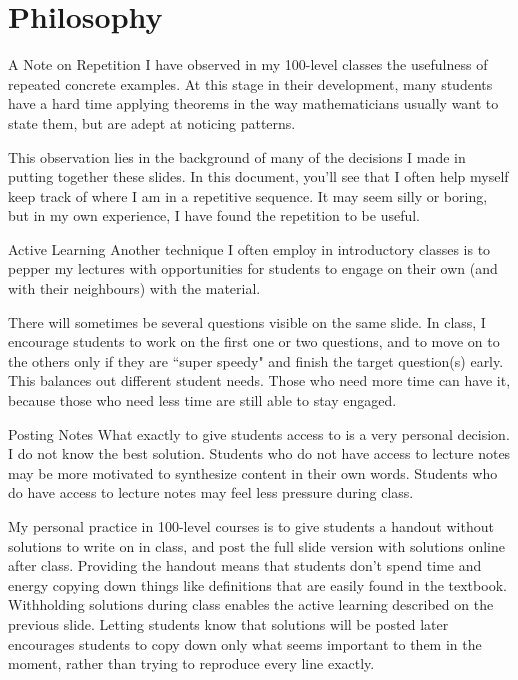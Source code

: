 \documentclass[10pt]{beamer}
\begin{document}
\section{Philosophy}
\frame{\tableofcontents[currentsection]}
\begin{frame}{A Note on Repetition}
I have observed in my 100-level classes the usefulness of repeated concrete examples. At this stage in their development, many students have a hard time applying theorems in the way mathematicians usually want to state them, but are adept at noticing patterns.\vfill

This observation lies in the background of many of the decisions I made in putting together these slides. In this document, you'll see that I often help myself keep track of where I am in a repetitive sequence. It may seem silly or boring, but in my own experience, I have found the repetition to be useful.
\end{frame}
\begin{frame}{Active Learning}
Another technique I often employ in introductory classes is to pepper my lectures with opportunities for students to engage on their own (and with their neighbours) with the material. \vfill

There will sometimes be several questions visible on the same slide. In class, I encourage students to work on the first one or two questions, and to move on to the others only if they are ``super speedy" and finish the target question(s) early. This balances out different student needs. Those who need more time can have it, because those who need less time are still able to stay engaged.
\end{frame}
\begin{frame}{Posting Notes}
What exactly to give students access to is a very personal decision.  I do not know the best solution. Students who do not have access to lecture notes may be more motivated to synthesize content in their own words. Students who do have access to lecture notes may feel less pressure during class. 
\vfill

My personal practice in 100-level courses is to give students a handout without solutions to write on in class, and post the full slide version with solutions online after class. Providing the handout means that students don't spend time and energy copying down things like definitions that are easily found in the textbook. Withholding solutions during class enables the active learning described on the previous slide. Letting students know that solutions will be posted later encourages students to copy down only what seems important to them in the moment, rather than trying to reproduce every line exactly.
\end{frame}
\end{document}

